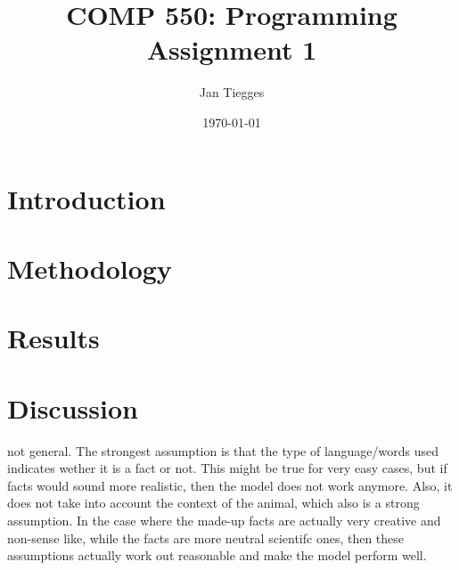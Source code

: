 \documentclass[12pt]{article}
\title{\textbf{COMP 550: Programming Assignment 1}}
\date{\today}
\author{Jan Tiegges}
\begin{document}
\maketitle

\section{Introduction}


\section{Methodology}


\section{Results}

\section{Discussion}




not general. The strongest assumption is that the type of language/words used indicates wether it is a fact or not. This might be true for very easy cases, but if facts would sound more realistic, then the model does not work anymore. Also, it does not take into account the context of the animal, which also is a strong assumption. In the case where the made-up facts are actually very creative and non-sense like, while the facts are more neutral scientifc ones, then these assumptions actually work out reasonable and make the model perform well.
\end{document}
